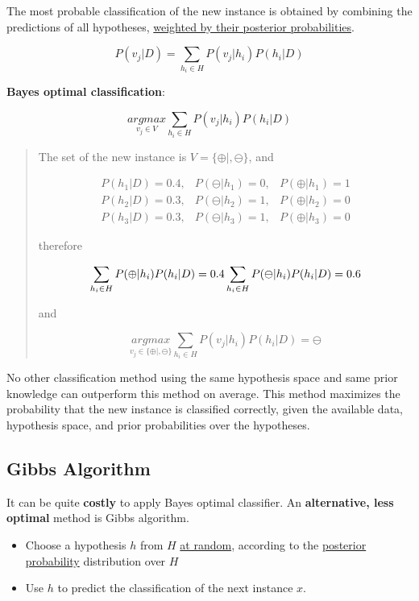 The most probable classification of the new instance is obtained by
combining the predictions of all hypotheses, \underline{weighted by their
posterior probabilities}.

\[P(v_j|D)=\sum_{h_i\in H}P(v_j|h_i)P(h_i|D)\]

\textbf{Bayes optimal classification}:

\[\underset{v_j\in V}{argmax}\sum_{h_i\in H}P(v_j|h_i)P(h_i|D)\]

\begin{quote}
The set of the new instance is \(V=\{\oplus|,\ominus\}\), and

\begin{equation*}
\begin{aligned}
P(h_1|D)=0.4,&P(\ominus|h_1)=0,&P(\oplus|h_1)=1\\
P(h_2|D)=0.3,&P(\ominus|h_2)=1,&P(\oplus|h_2)=0\\
P(h_3|D)=0.3,&P(\ominus|h_3)=1,&P(\oplus|h_3)=0
\end{aligned}
\end{equation*}


therefore

\[\sum_{h_i\in H}P(\oplus|h_i)P(h_i|D)=0.4\\
\sum_{h_i\in H}P(\ominus|h_i)P(h_i|D)=0.6\]

and

\[\underset{v_j\in\{\oplus|,\ominus\}}{argmax}\sum_{h_i\in H}P(v_j|h_i)P(h_i|D)=\ominus\]
\end{quote}

No other classification method using the same hypothesis space and same
prior knowledge can outperform this method on average. This method
maximizes the probability that the new instance is classified correctly,
given the available data, hypothesis space, and prior probabilities over
the hypotheses.

\hypertarget{gibbs-algorithm}{%
\subsection{Gibbs Algorithm}\label{gibbs-algorithm}}

It can be quite \textbf{costly} to apply Bayes optimal classifier. An
\textbf{alternative, less optimal} method is Gibbs algorithm.

\begin{itemize}
\item
  Choose a hypothesis \(h\) from \(H\) \underline{at random}, according to the
  \underline{posterior probability} distribution over \(H\)
\item
  Use \(h\) to predict the classification of the next instance \(x\).
\end{itemize}

